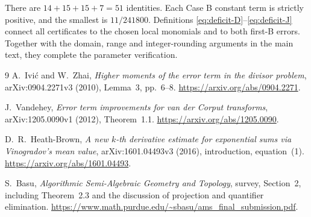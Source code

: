\documentclass[11pt,a4paper]{article}
\numberwithin{equation}{section}
\theoremstyle{remark}
\begin{document}
There are $14+15+15+7=51$ identities. Each Case B constant term is
strictly positive, and the smallest is $11/241800$.
Definitions \eqref{eq:deficit-D}--\eqref{eq:deficit-J} connect all
certificates to the chosen local monomials and to both first-B errors.
Together with the domain, range and integer-rounding arguments in the
main text, they complete the parameter verification.


\begin{thebibliography}{9}
A.~Ivi\'c and W.~Zhai,
\emph{Higher moments of the error term in the divisor problem},
arXiv:0904.2271v3 (2010), Lemma~3, pp.~6--8.
\url{https://arxiv.org/abs/0904.2271}.

J.~Vandehey,
\emph{Error term improvements for van der Corput transforms},
arXiv:1205.0090v1 (2012), Theorem~1.1.
\url{https://arxiv.org/abs/1205.0090}.

D.~R.~Heath-Brown,
\emph{A new $k$-th derivative estimate for exponential sums via
Vinogradov's mean value},
arXiv:1601.04493v3 (2016), introduction, equation~(1).
\url{https://arxiv.org/abs/1601.04493}.

S.~Basu,
\emph{Algorithmic Semi-Algebraic Geometry and Topology},
survey, Section~2, including Theorem~2.3 and the discussion of projection
and quantifier elimination.
\url{https://www.math.purdue.edu/~sbasu/ams_final_submission.pdf}.
\end{thebibliography}
\end{document}
